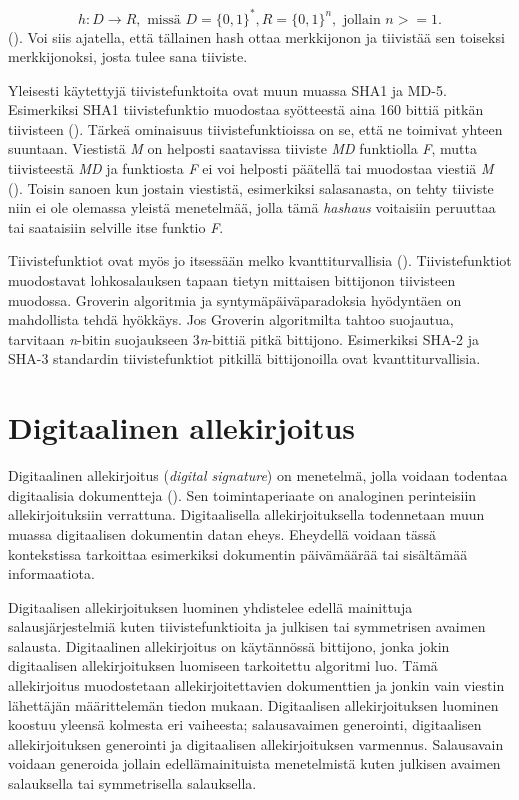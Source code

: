  \[h: D \to R, \text{ missä } D = \big\{0,1\big\}^{*}, R = \big\{0,1\big\}^{n}, \text{ jollain } n >= 1.\] (\cite{sobti2012cryptographic}). Voi siis ajatella, että tällainen hash ottaa merkkijonon ja tiivistää sen toiseksi merkkijonoksi, josta tulee sana tiiviste.
 
 Yleisesti käytettyjä tiivistefunktoita ovat muun muassa SHA1 ja MD-5. Esimerkiksi SHA1 tiivistefunktio muodostaa syötteestä aina 160 bittiä pitkän tiivisteen (\cite{bellare2005introduction}). Tärkeä ominaisuus tiivistefunktioissa on se, että ne toimivat yhteen suuntaan. Viestistä \emph{M} on helposti saatavissa tiiviste \emph{MD} funktiolla \emph{F}, mutta tiivisteestä \emph{MD} ja funktiosta \emph{F} ei voi helposti päätellä tai muodostaa viestiä \emph{M} (\cite{bakhtiari1995cryptographic}). Toisin sanoen kun jostain viestistä, esimerkiksi salasanasta, on tehty tiiviste niin ei ole olemassa yleistä menetelmää, jolla tämä \emph{hashaus} voitaisiin peruuttaa tai saataisiin selville itse funktio \emph{F}.
 
 Tiivistefunktiot ovat myös jo itsessään melko kvanttiturvallisia (\cite{mavroeidis2018impact}). Tiivistefunktiot muodostavat lohkosalauksen tapaan tietyn mittaisen bittijonon tiivisteen muodossa. Groverin algoritmia ja syntymäpäiväparadoksia hyödyntäen on mahdollista tehdä hyökkäys. Jos Groverin algoritmilta tahtoo suojautua, tarvitaan \emph{n}-bitin suojaukseen 3\emph{n}-bittiä pitkä bittijono. Esimerkiksi SHA-2 ja SHA-3 standardin tiivistefunktiot pitkillä bittijonoilla ovat kvanttiturvallisia.
 
 \section{Digitaalinen allekirjoitus}
 Digitaalinen allekirjoitus (\emph{digital signature}) on menetelmä, jolla voidaan todentaa digitaalisia dokumentteja (\cite{1649003}). Sen toimintaperiaate on analoginen perinteisiin allekirjoituksiin verrattuna. Digitaalisella allekirjoituksella todennetaan muun muassa digitaalisen dokumentin datan eheys. Eheydellä voidaan tässä kontekstissa tarkoittaa esimerkiksi dokumentin päivämäärää tai sisältämää informaatiota.
 
 Digitaalisen allekirjoituksen luominen yhdistelee edellä mainittuja salausjärjestelmiä kuten tiivistefunktioita ja julkisen tai symmetrisen avaimen salausta. Digitaalinen allekirjoitus on käytännössä bittijono, jonka jokin digitaalisen allekirjoituksen luomiseen tarkoitettu algoritmi luo. Tämä allekirjoitus muodostetaan allekirjoitettavien dokumenttien ja jonkin vain viestin lähettäjän määrittelemän tiedon mukaan. Digitaalisen allekirjoituksen luominen koostuu yleensä kolmesta eri vaiheesta; salausavaimen generointi, digitaalisen allekirjoituksen generointi ja digitaalisen allekirjoituksen varmennus. Salausavain voidaan generoida jollain edellämainituista menetelmistä kuten julkisen avaimen salauksella tai symmetrisella salauksella.